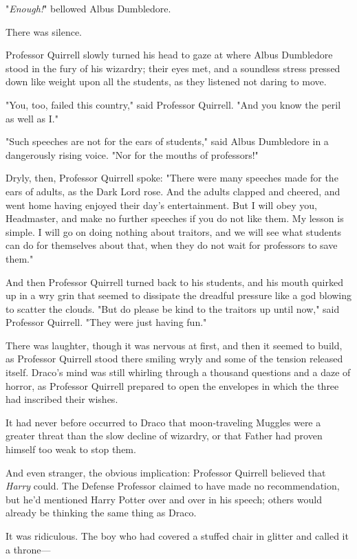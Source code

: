 "\emph{Enough!}" bellowed Albus Dumbledore.

There was silence.

Professor Quirrell slowly turned his head to gaze at where Albus Dumbledore
stood in the fury of his wizardry; their eyes met, and a soundless stress
pressed down like weight upon all the students, as they listened not daring to
move.

"You, too, failed this country," said Professor Quirrell. "And you know the
peril as well as I."

"Such speeches are not for the ears of students," said Albus Dumbledore in a
dangerously rising voice. "Nor for the mouths of professors!"

Dryly, then, Professor Quirrell spoke: "There were many speeches made for the
ears of adults, as the Dark Lord rose. And the adults clapped and cheered, and
went home having enjoyed their day's entertainment. But I will obey you,
Headmaster, and make no further speeches if you do not like them. My lesson is
simple. I will go on doing nothing about traitors, and we will see what
students can do for themselves about that, when they do not wait for professors
to save them."

And then Professor Quirrell turned back to his students, and his mouth quirked
up in a wry grin that seemed to dissipate the dreadful pressure like a god
blowing to scatter the clouds. "But do please be kind to the traitors up until
now," said Professor Quirrell. "They were just having fun."

There was laughter, though it was nervous at first, and then it seemed to
build, as Professor Quirrell stood there smiling wryly and some of the tension
released itself.
\sbreak
Draco's mind was still whirling through a thousand questions and a daze of
horror, as Professor Quirrell prepared to open the envelopes in which the three
had inscribed their wishes.

It had never before occurred to Draco that moon-traveling Muggles were a
greater threat than the slow decline of wizardry, or that Father had proven
himself too weak to stop them.

And even stranger, the obvious implication: Professor Quirrell believed that
\emph{Harry} could. The Defense Professor claimed to have made no
recommendation, but he'd mentioned Harry Potter over and over in his speech;
others would already be thinking the same thing as Draco.

It was ridiculous. The boy who had covered a stuffed chair in glitter and
called it a throne---

